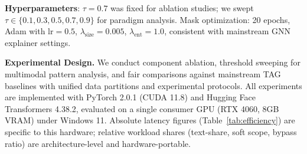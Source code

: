 \documentclass[preprint,12pt,authoryear]{elsarticle}
\begin{document}
\noindent\textbf{Hyperparameters}: $\tau=0.7$ was fixed for ablation studies; we swept $\tau \in \{0.1,0.3,0.5,0.7,0.9\}$ for paradigm analysis. Mask optimization: 20 epochs, Adam with $\text{lr}=0.5$, $\lambda_{\text{size}}=0.005$, $\lambda_{\text{ent}}=1.0$, consistent with mainstream GNN explainer settings.

\noindent\textbf{Experimental Design.} We conduct component ablation, threshold sweeping for multimodal pattern analysis, and fair comparisons against mainstream TAG baselines with unified data partitions and experimental protocols. All experiments are implemented with PyTorch 2.0.1 (CUDA 11.8) and Hugging Face Transformers 4.38.2, evaluated on a single consumer GPU (RTX 4060, 8GB VRAM) under Windows 11. Absolute latency figures (Table~\ref{tab:efficiency}) are specific to this hardware; relative workload shares (text-share, soft scope, bypass ratio) are architecture-level and hardware-portable.

\begin{table}[!t]
\centering
\small
\renewcommand{\arraystretch}{1.2}
\caption{Internal ablation results at fixed $\tau=0.7$. We report accuracy and the text-bypass ratio for each variant: Variant A uses only the Hard Router, Variant B only the Soft Masker, and CG-Net is the full dual-gating framework.
\textbf{Note}: On MUTAG the Soft Masker drives the text weight $s_T$ to $\sim$0 for the untrustworthy text, recovering the Drop-Text topology accuracy from a text-polluted static fusion; clean-text validation is given in Table~\ref{tab:sota}.}
\label{tab:ablation}
\end{table}
\end{document}
